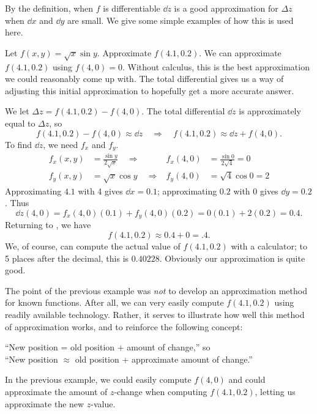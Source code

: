 By the definition, when $f$ is differentiable $\dd z$ is a good approximation for $\Delta z$ when $\dd x$ and $\dd y$ are small. We give some simple examples of how this is used here.

\begin{example}\label{ex_totaldiff2}%
Let $f(x,y)=\sqrt{x}\sin y$. Approximate $f(4.1,0.2)$.
\solution
We can approximate $f(4.1,0.2)$ using $f(4,0)=0$. Without calculus, this is the best approximation we could reasonably come up with. The total differential gives us a way of adjusting this initial approximation to hopefully get a more accurate answer.

We let $\Delta z = f(4.1,0.2) - f(4,0)$. The total differential $\dd z$ is approximately equal to $\Delta z$, so
\begin{equation}
f(4.1,0.2) - f(4,0) \approx \dd z
\quad \Rightarrow \quad
f(4.1,0.2) \approx \dd z + f(4,0).\label{eq:totaldiff2}%
\end{equation}
To find $\dd z$, we need $f_x$ and $f_y$.
\begin{align*}
f_x(x,y) &= \frac{\sin y}{2\sqrt{x}} \quad\Rightarrow&
f_x(4,0) &= \frac{\sin0}{2\sqrt{4}}=0 \\
f_y(x,y) &= \sqrt{x}\cos y \quad\Rightarrow&
f_y(4,0) &= \sqrt{4}\cos0=2
\end{align*}
Approximating $4.1$ with 4 gives $\dd x = 0.1$; approximating $0.2$ with $0$ gives $\dd y=0.2$. Thus
\[
\dd z(4,0) = f_x(4,0)(0.1) + f_y(4,0)(0.2)
=0(0.1) + 2(0.2)
=0.4.
\]
Returning to , we have
\[f(4.1,0.2) \approx 0.4 + 0 = .4.\]
We, of course, can compute the actual value of $f(4.1,0.2)$ with a calculator; to 5 places after the decimal, this is $0.40228$. Obviously our approximation is quite good.
\end{example}

The point of the previous example was \emph{not} to develop an approximation method for known functions. After all, we can very easily compute $f(4.1,0.2)$ using readily available technology. Rather, it serves to illustrate how well this method of approximation works, and to reinforce the following concept:
\begin{center}
	``New position = old position $+$ amount of change,'' so\\
	``New position $\approx$ old position + approximate amount of change.''
\end{center}

In the previous example, we could easily compute $f(4,0)$ and could approximate the amount of $z$-change when computing $f(4.1,0.2)$, letting us approximate the new $z$-value.

